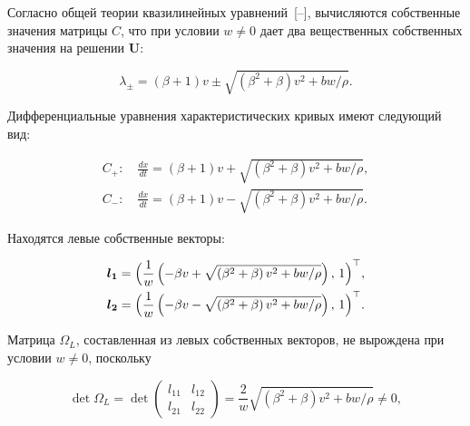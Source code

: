 Согласно общей теории квазилинейных уравнений~[--], вычисляются собственные значения матрицы $C$, что при условии $w \neq 0$ дает два вещественных собственных значения на решении ${\boldsymbol  U}$:

\begin{equation}

\lambda_{\pm} = \left(\beta + 1\right)v \pm \sqrt{\left(\beta^2 + \beta\right) v^2 + {bw}/{\rho}}.

\label{eq:3_3}

\end{equation}

Дифференциальные уравнения характеристических кривых имеют следующий вид:

\begin{gather}

C_+: \quad  \frac{dx}{dt} = \left(\beta + 1\right)v + \sqrt{\left(\beta^2 + \beta\right) v^2 + {bw}/{\rho}}, \label{eq:3_4} \\

C_-: \quad  \frac{dx}{dt} = \left(\beta + 1\right)v - \sqrt{\left(\beta^2 + \beta\right) v^2 + {bw}/{\rho}}. \label{eq:3_5}

\end{gather}

Находятся левые собственные векторы:

\begin{gather}

{\boldsymbol  l}_{\boldsymbol1}  = \Bigl(\frac{1}{w}\left(-\beta v + \sqrt{\left(\beta^2 + \beta\right) v^2 + {bw}/{\rho}}\right),\, 1 \Bigr)^{\top} , \label{eq:3_6} \\

{\boldsymbol  l}_{\boldsymbol 2}  = \Bigl(\frac{1}{w}\left(-\beta v - \sqrt{\left(\beta^2 + \beta\right) v^2 + {bw}/{\rho}}\right),\, 1 \Bigr)^{\top} . \label{eq:3_7} 

\end{gather}



Матрица $\Omega_L$, составленная из левых собственных векторов, не вырождена при условии $w \neq 0$, поскольку

\begin{equation}

\det \Omega_L = \det \left(\begin{matrix}l_{11} & l_{12} \\ l_{21} & l_{22} \end{matrix}\right) = \frac{2}{w}\sqrt{\left(\beta^2 + \beta\right) v^2 + {bw}/{\rho}} \neq 0,

\label{eq:3_8}

\end{equation}

